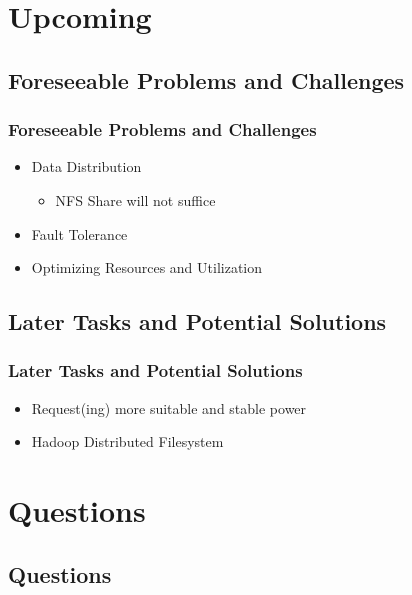 \documentclass{beamer}
\begin{document}
\section{Upcoming}
\begin{frame}
\tableofcontents[currentsection]
\end{frame}
\subsection{Foreseeable Problems and Challenges}
\begin{frame}
\frametitle{Foreseeable Problems and Challenges}
\begin{itemize}
\item{Data Distribution}
\begin{itemize}
\item{NFS Share will not suffice}
\end{itemize}
\item{Fault Tolerance}
\item{Optimizing Resources and Utilization}
\end{itemize}
\end{frame}
\subsection{Later Tasks and Potential Solutions}
\begin{frame}
\frametitle{Later Tasks and Potential Solutions}
\begin{itemize}
\item{Request(ing) more suitable and stable power}
\item{Hadoop Distributed Filesystem}
\end{itemize}
\end{frame}
\section*{Questions}
\subsection*{Questions}
\end{document}

